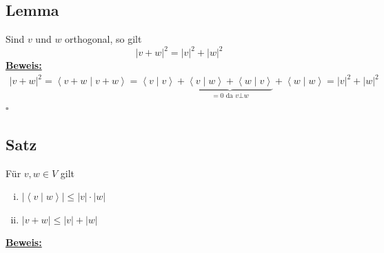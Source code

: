 \subsection{Lemma} %
\label{sub:lemma}
Sind $v$ und $w$ orthogonal, so gilt 
\[
	|v+w|^2 = |v|^2 + |w|^2
\]
\underline{\textbf{Beweis:}} \\
\begin{align*}
	|v+w|^2 = \left\langle v+w \mid v+w \right\rangle = \left\langle v \mid v \right\rangle + \underbrace{\left\langle v \mid w \right\rangle +
	 \left\langle w \mid v \right\rangle}_{= 0 \text{ da } v \bot w}
	+ \left\langle w \mid w \right\rangle  = |v|^2 + |w|^2
\end{align*}
\hfill \( \square \)

\subsection{Satz} %
\label{sub:satz}
Für $v,w \in V$ gilt 
\begin{enumerate}[(i)]
	\item $ \left| \left\langle v \mid w \right\rangle \right| \le |v| \cdot |w|$
	\item $|v+w| \le |v| + |w|$
\end{enumerate}
\underline{\textbf{Beweis:}} \\
